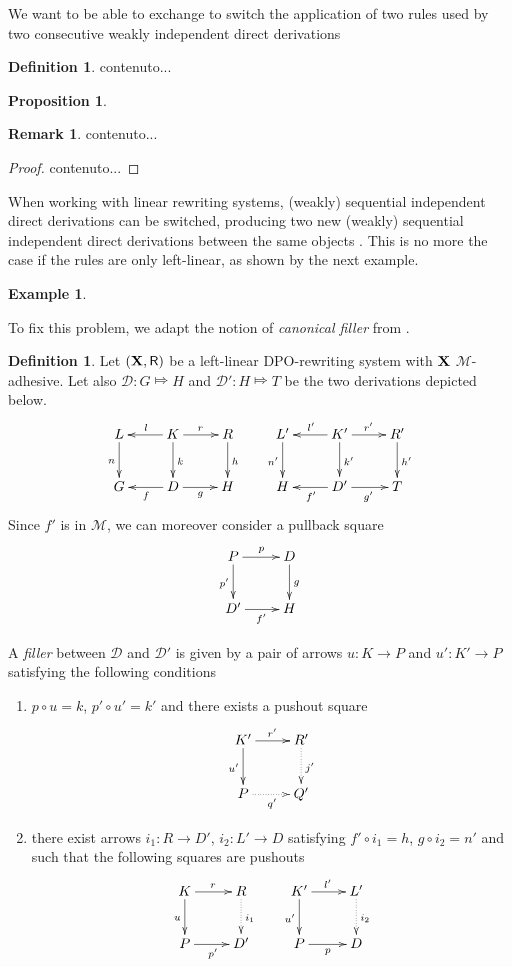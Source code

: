 \documentclass[a4paper]{article}
\def\R{\mathsf{R}}
\def\X{\textbf {\textup{X}}}
\renewcommand{\P}{\textbf {\textup{P}}}
\newcommand{\dder}[1]{\mathscr{#1}}
\newtheorem{proposition}[theorem]{Proposition}
\theoremstyle{definition}
\newtheorem{definition}[theorem]{Definition}
\newtheorem{remark}[theorem]{Remark}
\newtheorem{example}[theorem]{Example}
\begin{document}
We want to be able to exchange to switch the application of two rules used by two consecutive weakly independent direct derivations
\begin{definition}
	contenuto...
\end{definition}

\begin{proposition}
\end{proposition}
\begin{remark}
	contenuto...
\end{remark}
\begin{proof}
	contenuto...
\end{proof}




When working with linear rewriting systems, (weakly) sequential independent direct derivations can be switched, producing two new (weakly) sequential independent direct derivations between the same objects \cite[Thm.~$7.7$]{lack2005adhesive} . This is no more the case if the rules are only left-linear, as shown by the next example.

\begin{example}\label{ex:difficile}
\end{example}

To fix this problem, we adapt the notion of \emph{canonical filler} from \cite{heindel2009category}.






\begin{definition}\label{def:filler}
Let $(\X, \R)$ be a left-linear DPO-rewriting system with $\X$ $\mathcal{M}$-adhesive. Let also $\dder{D}\colon G\Mapsto H$ and $\dder{D}'\colon H\Mapsto T$ be the two derivations depicted below.
\[\xymatrix{L \ar[d]_{n}& K \ar[d]^{k}\ar[l]_{l} \ar[r]^{r} & R \ar[d]^{h} & L' \ar[d]_{n'}& K' \ar[d]^{k'}\ar[l]_{l'} \ar[r]^{r'} & R' \ar[d]^{h'}\\G & \ar[l]^{f} D \ar[r]_{g}& H & H & \ar[l]^{f'} D' \ar[r]_{g'}& T}\]
Since $f'$ is in $\mathcal{M}$, we can moreover consider a pullback square
\[\xymatrix{P \ar[r]^{p} \ar[d]_{p'}& D\ar[d]^{g} \\ D' \ar[r]_{f'} & H}\]

A \emph{filler} between $\dder{D}$ and $\dder{D}'$ is  given by a pair of arrows $u\colon K\to P$ and $u'\colon K'\to P$ satisfying the following conditions
\begin{enumerate}
	\item $p\circ u = k$, $p'\circ u' = k'$ and there exists a pushout square
\[\xymatrix{K' \ar[r]^{r'} \ar[d]_{u'}& R'\ar@{.>}[d]^{j'} \\ P \ar@{.>}[r]_{q'} & Q'}\]
	\item  there exist arrows $i_1\colon R\to D'$, $i_2\colon L'\to D$ satisfying $f'\circ i_1=h$, $g\circ i_2=n'$ and such that the following squares are pushouts
\[\xymatrix{K \ar[r]^{r} \ar[d]_{u}& R \ar@{.>}[d]^{i_1} &K' \ar[r]^{l'} \ar[d]_{u'}& L'\ar@{.>}[d]^{i_2} \\P \ar[r]_{p'}& D' & P \ar[r]_{p} & D}\]
\end{enumerate}
\end{definition}
\end{document}
